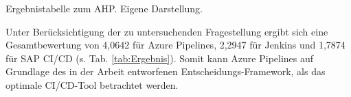\begin{center}
	\begin{table}[H]
		\centering
		\caption[Ergebnistabelle zum AHP]{Ergebnistabelle zum AHP. Eigene Darstellung.}
		\label{tab:Ergebnis}
	\end{table}
\end{center}
\vspace*{-15mm}
Unter Berücksichtigung der zu untersuchenden Fragestellung ergibt sich eine Gesamtbewertung von 4,0642 für Azure Pipelines, 2,2947 für Jenkins und 1,7874 für SAP CI/CD (s. Tab. \ref{tab:Ergebnis}). Somit kann Azure Pipelines auf Grundlage des in der Arbeit entworfenen Entscheidungs-Framework, als das optimale CI/CD-Tool betrachtet werden.  

